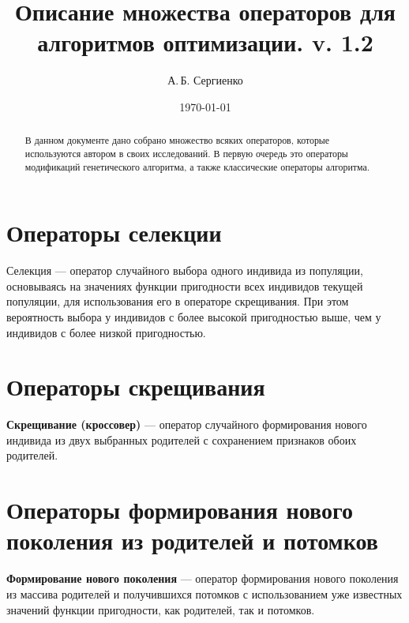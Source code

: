 \documentclass[a4paper,12pt]{article}
\title{Описание множества операторов для алгоритмов оптимизации. v. 1.2}
\author{А.\,Б. Сергиенко}
\date{\today}
\begin{document}


\maketitle

\begin{abstract}
В данном документе дано собрано множество всяких операторов, которые используются автором в своих исследований. В первую очередь это операторы модификаций генетического алгоритма, а также классические операторы алгоритма.
\end{abstract}

\tableofcontents

\newpage




\section{Операторы селекции}\label{SetOfOperatorsAlgorithms:section_selection}

Селекция --- оператор случайного выбора одного индивида из популяции, основываясь на значениях функции пригодности всех индивидов текущей популяции, для использования его в операторе скрещивания. При этом вероятность выбора у индивидов с более высокой пригодностью выше, чем у индивидов с более низкой пригодностью.





\section{Операторы скрещивания}\label{SetOfOperatorsAlgorithms:section_Crossover}

\textbf{Скрещивание (кроссовер)} --- оператор случайного формирования нового индивида из двух выбранных родителей с сохранением признаков обоих родителей.







\section{Операторы формирования нового поколения из родителей и потомков}\label{SetOfOperatorsAlgorithms:section_forming}

\textbf{Формирование нового поколения} --- оператор формирования нового поколения из массива родителей и получившихся потомков с использованием уже известных значений функции пригодности, как родителей, так и потомков.
\end{document}
